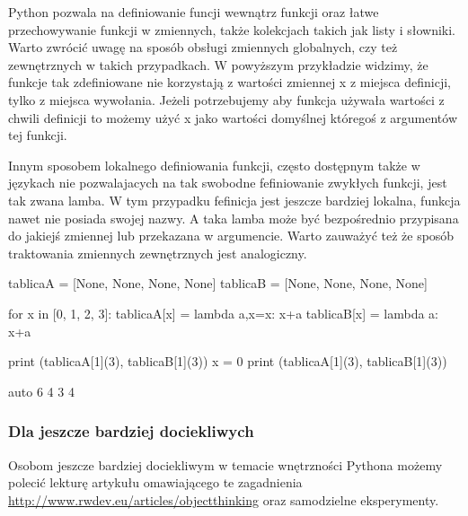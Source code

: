 Python pozwala na definiowanie funcji wewnątrz funkcji oraz łatwe przechowywanie funkcji w zmiennych, także kolekcjach takich jak listy i słowniki.
Warto zwrócić uwagę na sposób obsługi zmiennych globalnych, czy też zewnętrznych w takich przypadkach.
W powyższym przykładzie widzimy, że funkcje tak zdefiniowane nie korzystają z wartości zmiennej x z miejsca definicji, tylko z miejsca wywołania.
Jeżeli potrzebujemy aby funkcja używała wartości z chwili definicji to możemy użyć x jako wartości domyślnej któregoś z argumentów tej funkcji.

Innym sposobem lokalnego definiowania funkcji, często dostępnym także w językach nie pozwalajacych na tak swobodne fefiniowanie zwykłych funkcji, jest tak zwana lamba.
W tym przypadku fefinicja jest jeszcze bardziej lokalna, funkcja nawet nie posiada swojej nazwy.
A taka lamba może być bezpośrednio przypisana do jakiejś zmiennej lub przekazana w argumencie.
Warto zauważyć też że sposób traktowania zmiennych zewnętrznych jest analogiczny.

\begin{CodeFrame}[python]{0.55\textwidth}
tablicaA = [None, None, None, None]
tablicaB = [None, None, None, None]

for x in [0, 1, 2, 3]:
	tablicaA[x] = lambda a,x=x: x+a
	tablicaB[x] = lambda a: x+a

print (tablicaA[1](3), tablicaB[1](3))
x = 0
print (tablicaA[1](3), tablicaB[1](3))
\end{CodeFrame}
\begin{CodeFrame}{auto}
6 4
3 4
\end{CodeFrame}


\subsubsection{Dla jeszcze bardziej dociekliwych }

Osobom jeszcze bardziej dociekliwym w temacie wnętrzności Pythona możemy polecić lekturę artykułu omawiającego te zagadnienia \url{http://www.rwdev.eu/articles/objectthinking} oraz samodzielne eksperymenty.

